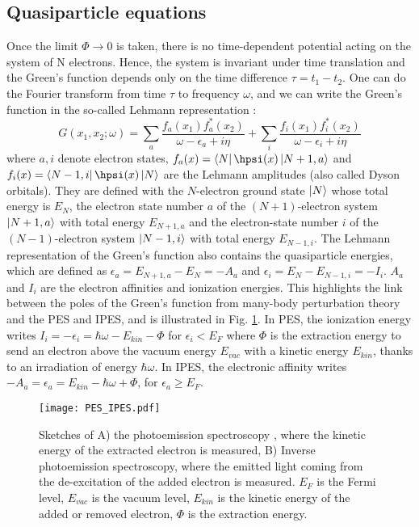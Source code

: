 %
\subsection{Quasiparticle equations}
Once the limit $\Phi \to 0$ is taken, there is no time-dependent potential acting on the system of N electrons. Hence, the system is invariant under time translation and the Green's function depends only on the time difference $\tau = t_1 - t_2$. One can do the Fourier transform from time $\tau$ to frequency $\omega$, and we can write the Green's function in the so-called Lehmann representation :
\begin{equation}
	G(x_1,x_2;\omega) = \sum_a \frac{f_a(x_1)f_a^*(x_2)}{\omega-\epsilon_a + i\eta} + \sum_i \frac{f_i(x_1)f_i^*(x_2)}{\omega-\epsilon_i + i\eta}
\end{equation}
where $a,i$ denote electron states, $f_a(x) = \bra{N}\hpsi(x)\ket{N+1,a}$ and \\ $f_i(x) = \bra{N-1,i} \hpsi(x) \ket{N}$ are the Lehmann amplitudes (also called Dyson orbitals). They are defined with the $N$-electron ground state $\ket{N}$ whose total energy is $E_N$, the electron state number $a$ of the $(N+1)$-electron system $\ket{N+1,a}$ with total energy $E_{N+1,a}$ and the electron-state number $i$ of the $(N-1)$-electron system $\ket{N-1,i}$ with total energy $E_{N-1,i}$.
The Lehmann representation of the Green's function also contains the quasiparticle energies, which are defined as $\epsilon_a = E_{N+1,a} - E_N = -A_a$ and $\epsilon_i = E_N - E_{N-1,i} = -I_i$. $A_a$ and $I_i$ are the electron affinities and ionization energies. This highlights the link between the poles of the Green's function from many-body perturbation theory and the \acrfull{PES} and \acrfull{IPES}, and is illustrated in Fig. \ref{fig:sketch_PES}. In \acrshort{PES}, the ionization energy writes $I_i = -\epsilon_i = \hbar \omega - E_{kin} - \Phi$ for $\epsilon_i < E_F$ where $\Phi$ is the extraction energy to send an electron above the vacuum energy $E_{vac}$ with a kinetic energy $E_{kin}$, thanks to an irradiation of energy $\hbar \omega$. In \acrshort{IPES}, the electronic affinity writes $-A_a = \epsilon_a = E_{kin} - \hbar \omega + \Phi$, for $\epsilon_a \geq E_F$.
\begin{figure}[h!tbp]
	\vspace{0.5cm}
	\setcapindent{2em}
	\centering
	\texttt{[image: PES\_IPES.pdf]}
	\caption{Sketches of A) the photoemission spectroscopy , where the kinetic energy of the extracted electron is measured, B) Inverse photoemission spectroscopy, where the emitted light coming from the de-excitation of the added electron is measured. $E_F$ is the Fermi level, $E_{vac}$ is the vacuum level, $E_{kin}$ is the kinetic energy of the added or removed electron, $\Phi$ is the extraction energy. }
	\label{fig:sketch_PES}
\end{figure}

